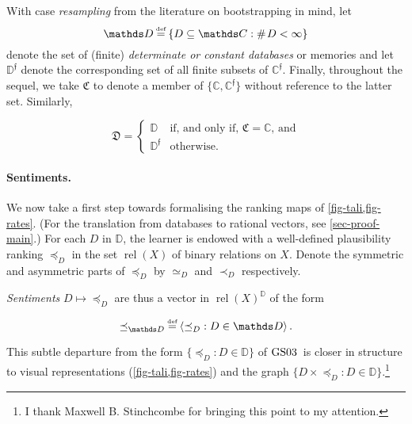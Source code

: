 \documentclass[12pt,a4paper,twoside]{article}
\newcommand{\gsii}{$\textup{GS03}$}
\newcommand{\relations}{\operatorname{rel}}
\newcommand{\novel}{\mathfrak f}
\newcommand{\precb}{\mathbin{\prec}}
\newcommand{\preceqb}{\mathbin{\preceq}}
\newcommand{\countof}{\mathbin{\#}\hskip1pt}
\newcommand{\mbbd}{{\mathds D}}
\newcommand{\mbbdp}{{\mathds D^{\novel}}}
\newcommand{\dpp}{{\mathfrak D}}
\newcommand{\mbbc}{{\mathds C}}
\newcommand{\mbbcp}{{\mathds C^{\novel}}}
\newcommand{\cpp}{{\mathfrak C}}
\newcommand{\lbc}{\left\{}
\newcommand{\rbc}{\right\}}
\begin{document}
With case \emph{resampling} from the literature on bootstrapping in mind, let
\begin{equation*}\mbbd\defeq \lbc D\subseteq \mbbc: \countof D < \infty \rbc \end{equation*} denote the set
of (finite) \emph{determinate or constant databases} or memories and let
$\mbbdp$ denote the corresponding set of all finite subsets of $\mbbcp$.
Finally, throughout the sequel, we take $\cpp$ to denote a member of
$\{\mbbc, \mbbcp\}$ without reference to the latter set. Similarly, 
\begin{linenomath*} \begin{equation*} \text{$\dpp$} =
  \left\{\begin{array}{ll} \mbbd & \text{if, and only if, $\cpp = \mbbc$,
  and}\\ \mbbdp & \text{otherwise.} \end{array}\right.  \end{equation*}
\end{linenomath*}
\paragraph{Sentiments.}\hskip-5pt We now take a first
step towards formalising the ranking maps of \cref{fig-tali,fig-rates}.
(For the translation from databases to rational vectors, see
\cref{sec-proof-main}.)
For each $D$ in $\mbbd$, the learner is endowed with a well-defined
plausibility ranking $\preceqb_D$ in the set $\relations(X)$ of binary
relations on $X$.  Denote the symmetric and asymmetric parts of $\preceqb_D$ by
$\simeq _D$ and $\precb_D$ respectively. 

\emph{Sentiments} $D \mapsto \preceqb_{D}$ are thus a vector in
$\relations(X)^{\mbbd}$ of the form
\begin{linenomath*}
  \begin{equation*}\preceqb_{\mbbd} \defeq \langle\preceqb_{D} : D\in
  \mbbd\rangle\,.\end{equation*}
\end{linenomath*}
This subtle departure from the form $\{\preceqb_{D} : D \in \mbbd\}$ of \gsii\
is closer in structure to visual representations (\cref{fig-tali,fig-rates})
and the graph $\{D \times \preceqb_{D} : D \in \mbbd\}$.\footnote{I thank
Maxwell B.  Stinchcombe for bringing this point to my attention.}
\end{document}

